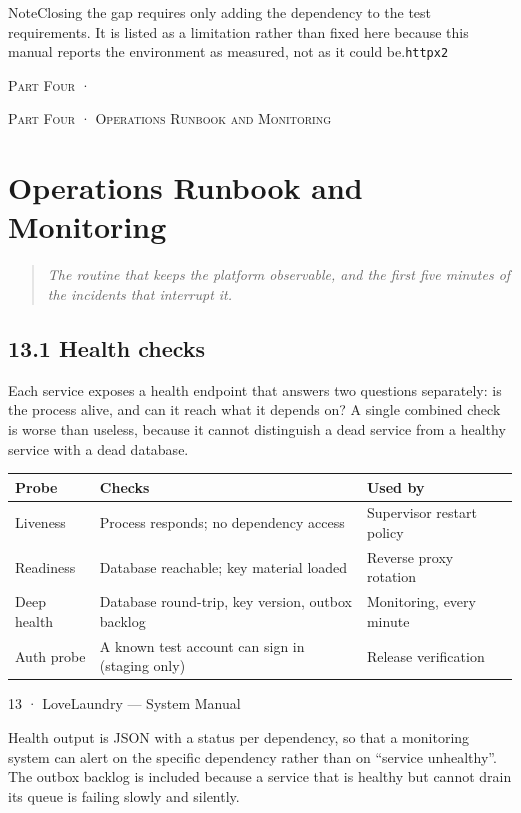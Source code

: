 \documentclass[11pt,a4paper,oneside]{book}
\begin{document}
\begin{notebox}NoteClosing the  gap requires only adding the dependency to the test requirements. It is listed as a limitation rather than fixed here because this manual reports the environment as measured, not as it could be.\texttt{httpx2}\end{notebox}
\textsc{\small\color{crimson}Part Four ·}\par\medskip
\textsc{\small\color{crimson}Part Four · Operations Runbook and Monitoring}\par\medskip
\chapter{Operations Runbook and Monitoring}
\begin{quote}\itshape The routine that keeps the platform observable, and the first five minutes of the incidents that interrupt it.\end{quote}
\section{13.1 Health checks}
Each service exposes a health endpoint that answers two questions separately: is the process alive, and can it reach what it depends on? A single combined check is worse than useless, because it cannot distinguish a dead service from a healthy service with a dead database.

\begin{center}\small
\begin{tabularx}{\linewidth}{|X|X|X|}
\hline
\rowcolor{lightgrey}
\textbf{Probe} & \textbf{Checks} & \textbf{Used by} \\ \hline
Liveness & Process responds; no dependency access & Supervisor restart policy \\ \hline
Readiness & Database reachable; key material loaded & Reverse proxy rotation \\ \hline
Deep health & Database round-trip, key version, outbox backlog & Monitoring, every minute \\ \hline
Auth probe & A known test account can sign in (staging only) & Release verification \\ \hline
\end{tabularx}
\end{center}
13 · LoveLaundry — System Manual

Health output is JSON with a status per dependency, so that a monitoring system can alert on the specific dependency rather than on “service unhealthy”. The outbox backlog is included because a service that is healthy but cannot drain its queue is failing slowly and silently.
\end{document}
